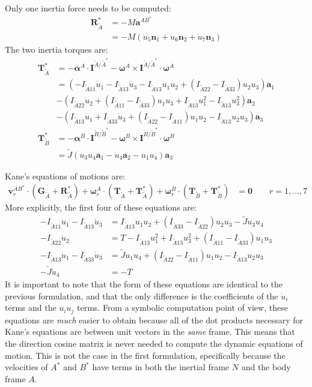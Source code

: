 \documentclass[letterpaper,11pt]{article}
\newcommand{\bs}[1]{ \boldsymbol{ #1 } }
\begin{document}
Only one inertia force needs to be computed:
\begin{align*}
  \bs{R}^*_{\tilde{A}} & = -M\bs{a}^{AB^*}\\
  & = -M\left(\dot{u}_5 \bs{n}_1 + \dot{u}_6 \bs{n}_2 + \dot{u}_7
  \bs{n}_3\right)
\end{align*}
The two inertia torques are:
\begin{align*}
  \bs{T}^*_{\tilde{A}} & = - \bs{\alpha}^A \cdot \bs{I}^{\tilde{A}/\tilde{A}^*}
  - \bs{\omega}^A \times \bs{I}^{\tilde{A}/\tilde{A}^*} \cdot \bs{\omega}^A
  \\
  & =
  (-I_{\tilde{A}11}\dot{u}_1 - I_{\tilde{A}13}\dot{u}_3
  - I_{\tilde{A}13}u_1u_2 + (I_{\tilde{A}22} - I_{\tilde{A}33})u_2u_3 )\bs{a}_1
  \\
  & - (I_{\tilde{A}22}\dot{u}_2 + (I_{\tilde{A}11} - I_{\tilde{A}33})u_1u_3
  + I_{\tilde{A}13}u_1^2 - I_{\tilde{A}13}u_3^2)\bs{a}_2
  \\
  & - (I_{\tilde{A}13}\dot{u}_1 + I_{\tilde{A}33}\dot{u}_3 + (I_{\tilde{A}22}
  - I_{\tilde{A}11})u_1u_2 - I_{\tilde{A}13}u_2u_3)\bs{a}_3
  \\
  \bs{T}^*_{\tilde{B}} & = -\bs{\alpha}^B \cdot \bs{I}^{\tilde{B}/\tilde{B}^*}
  - \bs{\omega}^B \times \bs{I}^{\tilde{B}/\tilde{B}^*} \cdot \bs{\omega}^B \\
  & = \tilde{J}(u_3u_4\bs{a}_1 - \dot{u}_4\bs{a}_2 - u_1u_4)\bs{a}_3
\end{align*}

Kane's equations of motions are:
\begin{align*}
  \bs{v}^{AB^*}_r \cdot (\bs{G}_{\tilde{A}} + \bs{R}^*_{\tilde{A}}) +
  \bs{\omega}^A_r \cdot (\bs{T}_{\tilde{A}} + \bs{T}^*_{\tilde{A}}) +
  \bs{\omega}^B_r \cdot (\bs{T}_{\tilde{B}} + \bs{T}^*_{\tilde{B}}) & = \bs{0} \qquad r = 1,\dots,7
\end{align*}
More explicitly, the first four of these equations are:
\begin{align*}
  -I_{\tilde{A}11}\dot{u}_1 - I_{\tilde{A}13}\dot{u}_3 &= I_{\tilde{A}13}u_1u_2
  + (I_{\tilde{A}33} - I_{\tilde{A}22})u_2u_3 - \tilde{J}u_3u_4
  \\
  -I_{\tilde{A}22}\dot{u}_2 &=  T - I_{\tilde{A}13}u_1^2 + I_{\tilde{A}13}u_3^2
  + (I_{\tilde{A}11} - I_{\tilde{A}33})u_1u_3
 \\
 -I_{\tilde{A}13}\dot{u}_1 - I_{\tilde{A}33}\dot{u}_3 & =  \tilde{J}u_1u_4 +
 (I_{\tilde{A}22} - I_{\tilde{A}11})u_1u_2 - I_{\tilde{A}13}u_2u_3
 \\
 -\tilde{J}\dot{u}_4 &= -T
\end{align*}
It is important to note that the form of these equations are identical to the
previous formulation, and that the only difference is the coefficients of the
$\dot{u}_i$ terms and the $u_iu_j$ terms.  From a symbolic computation point of
view, these equations are {\it{much}} easier to obtain because all of the dot
products necessary for Kane's equations are between unit vectors in the
{\it{same}} frame.  This means that the direction cosine matrix is never
needed to compute the dynamic equations of motion.  This is not the case in the
first formulation, specifically because the velocities of $A^*$ and $B^*$ have
terms in both the inertial frame $N$ and the body frame $A$.
\end{document}
